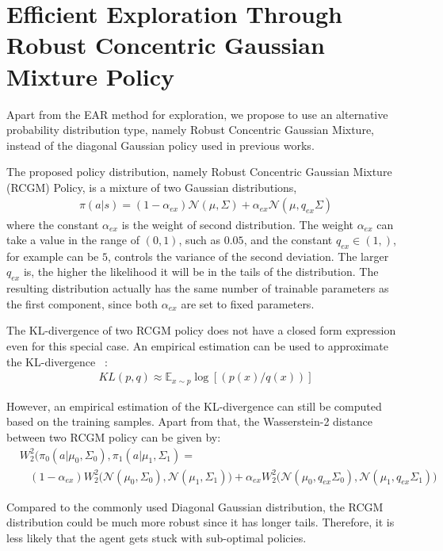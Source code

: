 \section{Efficient Exploration Through Robust Concentric Gaussian Mixture Policy}
Apart from the EAR method for exploration, we propose to use an alternative probability distribution type, namely Robust Concentric Gaussian Mixture, instead of the diagonal Gaussian policy used in previous works.

The proposed policy distribution, namely Robust Concentric Gaussian Mixture (RCGM) Policy, is a mixture of two Gaussian distributions,
\begin{align}
\pi (a|s) = (1-\alpha_{ex})\mathcal{N}(\mu,\Sigma) + \alpha_{ex} \mathcal{N}(\mu,q_{ex}\Sigma)
\end{align}
where the constant $\alpha_{ex}$ is the weight of second distribution. The weight $\alpha_{ex}$ can take a value in the range of $(0,1)$, such as $0.05$, and the constant $q_{ex} \in (1,)$, for example can be $5$, controls the variance of the second deviation. The larger $q_{ex}$ is, the higher the likelihood it will be in the tails of the distribution. The resulting distribution actually has the same number of trainable parameters as the first component, since both $\alpha_{ex}$ are set to fixed parameters.

The KL-divergence of two RCGM policy does not have a closed form expression even for this special case. An empirical estimation can be used to approximate the KL-divergence ~\cite{hershey2007approximat}:%
\begin{align}
KL(p, q) \approx\mathbb{E}_{x\sim p} \log [ \left(p(x)/q(x)\right) ]
\end{align}

However, an empirical estimation of the KL-divergence can still be computed based on the training samples. Apart from that, the Wasserstein-2 distance between two RCGM policy can be given by:
\begin{align}&W_2^2(\pi_{0}(a|\mu_0,\Sigma_0), \pi_{1}(a|\mu_1,\Sigma_1) =  \\ \nonumber
& \ \ \ \ (1-\alpha_{ex})
W_2^2\big(\mathcal{N}(\mu_0,\Sigma_0), \mathcal{N}(\mu_1,\Sigma_1)\big)
+ \alpha_{ex} W_2^2\big(\mathcal{N}(\mu_0,q_{ex}\Sigma_0), \mathcal{N}(\mu_1,q_{ex}\Sigma_1)\big)
\end{align}


Compared to the commonly used Diagonal Gaussian distribution, the RCGM distribution could be much more robust since it has longer tails. Therefore, it is less likely that the agent gets stuck with sub-optimal policies.

